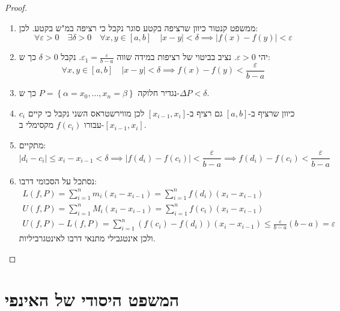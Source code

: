 \documentclass{tstextbook}
\begin{document}
\begin{proof}
  \begin{enumerate}
    \item ממשפט קנטור כיוון שרציפה בקטע סוגר נקבל כי רציפה במ"ש בקטע. לכן: 
$$\forall \varepsilon>0 \quad \exists \delta> 0\quad \forall x,y \in[a,b]\quad \lvert x-y \rvert <\delta\implies \lvert f(x)-f(y) \rvert <\varepsilon$$


    \item יהי \(\varepsilon>0\). נציב בביטוי של רציפות במידה שווה \(\varepsilon_{1}=\frac{\varepsilon}{b-a}\). נקבל \(\delta> 0\) כך ש: 
$$\forall x,y \in [a,b]\quad \lvert x-y \rvert <\delta\implies f(x)-f(y)<\frac{\varepsilon}{b-a}$$


    \item נגדיר חלוקה \(P=\left\{  \alpha=x_{0},\dots,x_{n}=\beta  \right\}\) כך ש-\(\Delta P<\delta\). 


    \item כיוון שרציף ב-\([a,b]\) גם רציף ב-\([x_{i-1},x_{i}]\) לכן מווירשטראס השני נקבל כי קיים \(c_{i}\) עבורו \(f(c_{i})\) מקסימלי ב-\([x_{i-1},x_{i}]\). 


    \item מתקיים: 
$$\lvert d_{i}-c_{i} \rvert \leq x_{i}-x_{i-1}<\delta\implies \lvert f(d_{i})-f(c_{i}) \rvert <\frac{\varepsilon}{b-a}\implies f(d_{i})-f(c_{i})<\frac{\varepsilon}{b-a}$$


    \item נסתכל על הסכומי דרבו: 
\begin{gather*}L(f,P)=\sum_{i=1}^{n} m_{i}(x_{i}-x_{i-1})=\sum_{i=1}^{n} f(d_{i})(x_{i}-x_{i-1})  \\U(f,P)=\sum_{i=1}^{n} M_{i}(x_{i}-x_{i-1})=\sum_{i=1}^{n} f(c_{i})(x_{i}-x_{i-1}) \\U(f,P)-L(f,P)=\sum_{i=1}^{n} (f(c_{i})-f(d_{i}))(x_{i}-x_{i-1})\leq \frac{\varepsilon}{b-a}(b-a)=\varepsilon
\end{gather*}
ולכן אינטגבילי מתנאי דרבו לאינטגרביליות.


  \end{enumerate}
\end{proof}
\section{המשפט היסודי של האינפי}
\end{document}
